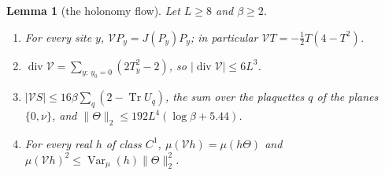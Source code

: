 \documentclass[aps,prd,twocolumn,superscriptaddress,nofootinbib,longbibliography,floatfix,amsmath,amssymb,10pt]{revtex4-2}
\newtheorem{lemma}[theorem]{Lemma}
\theoremstyle{definition}
\theoremstyle{remark}
\newcommand{\Tr}{\operatorname{Tr}}
\newcommand{\Var}{\operatorname{Var}}
\begin{document}
\begin{lemma}[the holonomy flow]\label{lem:bpflow}
Let $L\ge8$ and $\beta\ge2$.
\begin{enumerate}[label=\textup{(\roman*)},leftmargin=*]
\item For every site $y$, $\mathcal VP_y=J(P_y)P_y$; in particular
$\mathcal VT=-\frac12T(4-T^2)$.
\item $\operatorname{div}\mathcal V=\sum_{y:\,y_0=0}(2T_y^2-2)$, so
$\lvert\operatorname{div}\mathcal V\rvert\le6L^3$.
\item $\lvert\mathcal VS\rvert\le16\beta\sum_q(2-\Tr U_q)$, the sum over the
plaquettes $q$ of the planes $\{0,\nu\}$, and $\lVert\Theta\rVert_2\le192
L^4(\log\beta+5.44)$.
\item For every real $h$ of class $C^1$, $\mu(\mathcal Vh)=\mu(h\Theta)$ and
$\mu(\mathcal Vh)^2\le\Var_\mu(h)\lVert\Theta\rVert_2^2$.
\end{enumerate}
\end{lemma}
\end{document}
